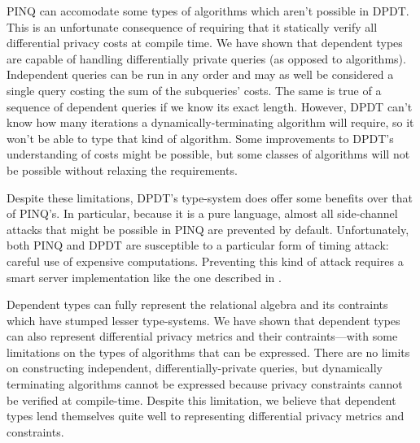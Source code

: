 \documentclass[12pt]{report}
\begin{document}
PINQ can accomodate some types of algorithms which aren't possible in DPDT.
This is an unfortunate consequence of requiring that it statically verify all differential privacy costs at compile time.
We have shown that dependent types are capable of handling differentially private queries (as opposed to algorithms).
Independent queries can be run in any order and may as well be considered a single query costing the sum of the subqueries' costs.
The same is true of a sequence of dependent queries if we know its exact length.
However, DPDT can't know how many iterations a dynamically-terminating algorithm will require, so it won't be able to type that kind of algorithm.
Some improvements to DPDT's understanding of costs might be possible, but some classes of algorithms will not be possible without relaxing the requirements.

Despite these limitations, DPDT's type-system does offer some benefits over that of PINQ's.
In particular, because it is a pure language, almost all side-channel attacks that might be possible in PINQ are prevented by default.
Unfortunately, both PINQ and DPDT are susceptible to a particular form of timing attack: careful use of expensive computations.
Preventing this kind of attack requires a smart server implementation like the one described in \cite{conf/uss/HaeberlenPN11}.

Dependent types can fully represent the relational algebra and its contraints which have stumped lesser type-systems\cite{OurySwierstra08PowerOfPi}.
We have shown that dependent types can also represent differential privacy metrics and their contraints---with some limitations on the types of algorithms that can be expressed.
There are no limits on constructing independent, differentially-private queries, but dynamically terminating algorithms cannot be expressed because privacy constraints cannot be verified at compile-time.
Despite this limitation, we believe that dependent types lend themselves quite well to representing differential privacy metrics and constraints.



\end{document}
